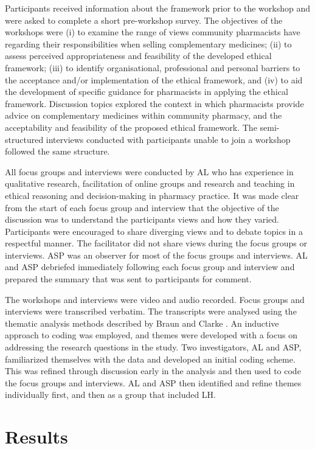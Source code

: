 \documentclass[11pt,a4paper]{article}
\begin{document}
Participants received information about the framework prior to the
workshop and were asked to complete a short pre-workshop survey. The
objectives of the workshops were (i) to examine the range of views
community pharmacists have regarding their responsibilities when selling
complementary medicines; (ii) to assess perceived appropriateness and
feasibility of the developed ethical framework; (iii) to identify
organisational, professional and personal barriers to the acceptance
and/or implementation of the ethical framework, and (iv) to aid the
development of specific guidance for pharmacists in applying the ethical
framework. Discussion topics explored the context in which pharmacists
provide advice on complementary medicines within community pharmacy, and
the acceptability and feasibility of the proposed ethical framework. The
semi-structured interviews conducted with participants unable to join a
workshop followed the same structure.

All focus groups and interviews were conducted by AL who has experience
in qualitative research, facilitation of online groups and research and
teaching in ethical reasoning and decision-making in pharmacy practice.
It was made clear from the start of each focus group and interview that
the objective of the discussion was to understand the participants views
and how they varied. Participants were encouraged to share diverging
views and to debate topics in a respectful manner. The facilitator did
not share views during the focus groups or interviews. ASP was an
observer for most of the focus groups and interviews. AL and ASP
debriefed immediately following each focus group and interview and
prepared the summary that was sent to participants for comment.

The workshops and interviews were video and audio recorded. Focus groups
and interviews were transcribed verbatim. The transcripts were analysed
using the thematic analysis methods described by Braun and Clarke
\autocite*{Braun2016}. An inductive approach to coding was employed, and
themes were developed with a focus on addressing the research questions
in the study. Two investigators, AL and ASP, familiarized themselves
with the data and developed an initial coding scheme. This was refined
through discussion early in the analysis and then used to code the focus
groups and interviews. AL and ASP then identified and refine themes
individually first, and then as a group that included LH.

\section{Results}\label{results}
\end{document}
